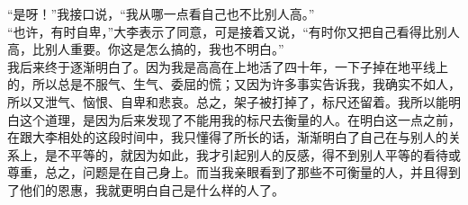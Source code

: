 “是呀！”我接口说，“我从哪一点看自己也不比别人高。”\\

“也许，有时自卑，”大李表示了同意，可是接着又说，“有时你又把自己看得比别人高，比别人重要。你这是怎么搞的，我也不明白。”\\

我后来终于逐渐明白了。因为我是高高在上地活了四十年，一下子掉在地平线上的，所以总是不服气、生气、委屈的慌；又因为许多事实告诉我，我确实不如人，所以又泄气、恼恨、自卑和悲哀。总之，架子被打掉了，标尺还留着。我所以能明白这个道理，是因为后来发现了不能用我的标尺去衡量的人。在明白这一点之前，在跟大李相处的这段时间中，我只懂得了所长的话，渐渐明白了自己在与别人的关系上，是不平等的，就因为如此，我才引起别人的反感，得不到别人平等的看待或尊重，总之，问题是在自己身上。而当我亲眼看到了那些不可衡量的人，并且得到了他们的恩惠，我就更明白自己是什么样的人了。